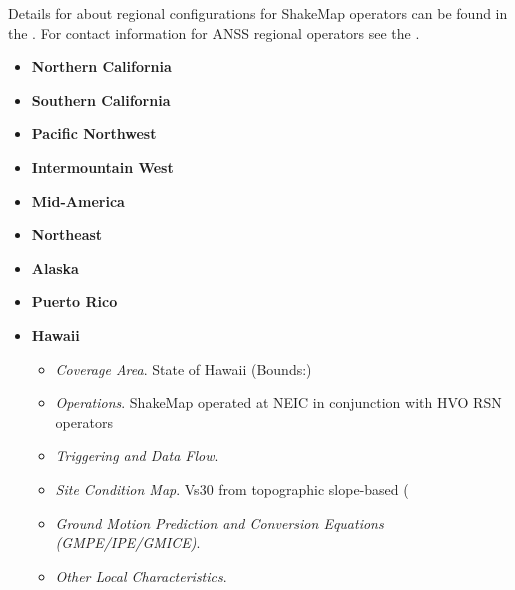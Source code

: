 \documentclass[letterpaper,10pt,english]{sphinxmanual}
\begin{document}
Details for about regional configurations for ShakeMap operators can
be found in the {\hyperref[software_guide:software\string-guide]{}}. For contact information for
ANSS regional operators see the {\hyperref[acknowledgments:acknowledgments]{}}.
\begin{itemize}
\item {} 
\textbf{Northern California}

\item {} 
\textbf{Southern California}

\item {} 
\textbf{Pacific Northwest}

\item {} 
\textbf{Intermountain West}

\item {} 
\textbf{Mid-America}

\item {} 
\textbf{Northeast}

\item {} 
\textbf{Alaska}

\item {} 
\textbf{Puerto Rico}

\item {} 
\textbf{Hawaii}
\begin{itemize}
\item {} 
\emph{Coverage Area}. State of Hawaii (Bounds:)

\item {} 
\emph{Operations}. ShakeMap operated at NEIC in conjunction with HVO RSN operators

\item {} 
\emph{Triggering and Data Flow}.

\item {} 
\emph{Site Condition Map}. Vs30 from topographic slope-based ({\hyperref[references:allen2009b]{}}

\item {} 
\emph{Ground Motion Prediction and Conversion Equations (GMPE/IPE/GMICE)}.

\item {} 
\emph{Other Local Characteristics}.

\end{itemize}

\end{itemize}
\end{document}
